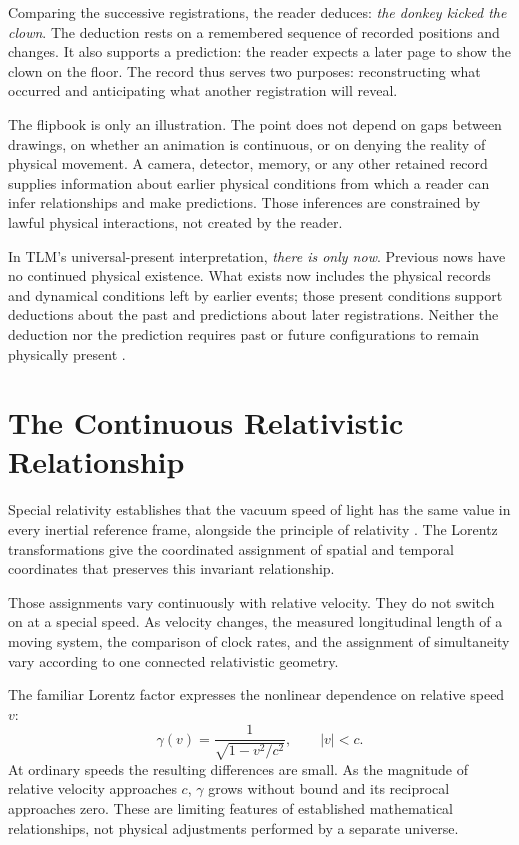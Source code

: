 \documentclass[11pt]{article}
\begin{document}
Comparing the successive registrations, the reader deduces: \emph{the donkey kicked the clown}. The deduction rests on a remembered sequence of recorded positions and changes. It also supports a prediction: the reader expects a later page to show the clown on the floor. The record thus serves two purposes: reconstructing what occurred and anticipating what another registration will reveal.

The flipbook is only an illustration. The point does not depend on gaps between drawings, on whether an animation is continuous, or on denying the reality of physical movement. A camera, detector, memory, or any other retained record supplies information about earlier physical conditions from which a reader can infer relationships and make predictions. Those inferences are constrained by lawful physical interactions, not created by the reader.

In TLM's universal-present interpretation, \emph{there is only now}. Previous nows have no continued physical existence. What exists now includes the physical records and dynamical conditions left by earlier events; those present conditions support deductions about the past and predictions about later registrations. Neither the deduction nor the prediction requires past or future configurations to remain physically present \cite{mckinleybox2026,mckinleymotion2026}.

\section{The Continuous Relativistic Relationship}

Special relativity establishes that the vacuum speed of light has the same value in every inertial reference frame, alongside the principle of relativity \cite{einstein1905,taylorwheeler1992}. The Lorentz transformations give the coordinated assignment of spatial and temporal coordinates that preserves this invariant relationship.

Those assignments vary continuously with relative velocity. They do not switch on at a special speed. As velocity changes, the measured longitudinal length of a moving system, the comparison of clock rates, and the assignment of simultaneity vary according to one connected relativistic geometry.

The familiar Lorentz factor expresses the nonlinear dependence on relative speed $v$:
\[
\gamma(v)=\frac{1}{\sqrt{1-v^2/c^2}},\qquad |v|<c.
\]
At ordinary speeds the resulting differences are small. As the magnitude of relative velocity approaches $c$, $\gamma$ grows without bound and its reciprocal approaches zero. These are limiting features of established mathematical relationships, not physical adjustments performed by a separate universe.
\end{document}
